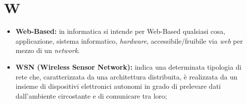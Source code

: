 \documentclass[11pt]{book}              %
\begin{document}
\section*{W}
\begin{itemize}
	\item \textbf{{\color{Plum}Web-Based}:} in informatica si intende per Web-Based qualsiasi cosa, applicazione, sistema informatico, \textit{hardware}, accessibile/fruibile via \textit{web} per mezzo di un \textit{network}.
	
	\item \textbf{{\color{OliveGreen} WSN} (Wireless Sensor Network):}  indica una determinata tipologia di rete che, caratterizzata da una architettura distribuita, è realizzata da un insieme di dispositivi elettronici autonomi in grado di prelevare dati dall'ambiente circostante e di comunicare tra loro;


\end{itemize}
\end{document}
